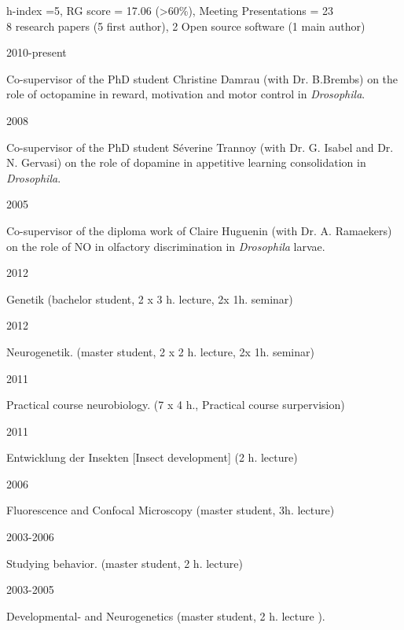 %
h-index =5,
RG score = 17.06 (>60\%),
Meeting Presentations = 23
\\
8 research papers (5 first author), 2 Open source software (1 main author)

\newpage

\parbox{0.15\textwidth}{2010-present}\hfill
	\parbox[t]{0.83\textwidth}{Co-supervisor of the PhD student Christine Damrau
(with Dr. B.Brembs) on the role of octopamine in reward, motivation and motor control in  \textit{Drosophila}.}
\parbox{0.15\textwidth}{2008}\hfill
	\parbox[t]{0.83\textwidth}{Co-supervisor of the PhD student S\'everine Trannoy
(with Dr. G. Isabel and Dr. N. Gervasi) on the role of dopamine in appetitive learning consolidation in  \textit{Drosophila}.}
\parbox{0.15\textwidth}{2005}\hfill
\parbox[t]{0.83\textwidth}{Co-supervisor of the diploma work of Claire Huguenin
(with Dr. A. Ramaekers) on the role of NO in olfactory discrimination in \textit{Drosophila} larvae.}





\parbox{0.15\textwidth}{2012}\hfill
\parbox[t]{0.83\textwidth}{Genetik (bachelor student, 2 x 3 h. lecture, 2x 1h. seminar)}
\parbox{0.15\textwidth}{2012}\hfill
\parbox[t]{0.83\textwidth}{Neurogenetik. (master student, 2 x 2 h. lecture, 2x 1h. seminar)}

\parbox{0.15\textwidth}{2011}\hfill
\parbox[t]{0.83\textwidth}{Practical course neurobiology. (7 x 4 h., Practical course surpervision)}
\parbox{0.15\textwidth}{2011}\hfill
\parbox[t]{0.83\textwidth}{Entwicklung der Insekten [Insect development] (2 h. lecture)}
 
\parbox{0.15\textwidth}{2006}\hfill
\parbox[t]{0.83\textwidth}{Fluorescence and Confocal Microscopy (master student, 3h. lecture)}
\parbox{0.15\textwidth}{2003-2006}\hfill
\parbox[t]{0.83\textwidth}{Studying behavior. (master student, 2 h. lecture)}
\parbox{0.15\textwidth}{2003-2005}\hfill
\parbox[t]{0.83\textwidth}{Developmental- and Neurogenetics %
(master student, 2 h. lecture%
).}




